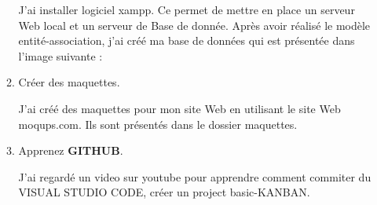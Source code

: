 \documentclass{article}
\begin{document}
\begin{enumerate}
\begin{enumerate}
           
            \setlength{\parindent}{1cm}  J'ai installer logiciel xampp. Ce permet de mettre en place un serveur Web local et un serveur de Base de donnée. Après avoir réalisé le modèle entité-association, j'ai créé ma base de données qui est présentée dans l'image suivante :
            
            
            
            \hspace*{-1.05in}
               \noindent{}
        
        
         \item \textcolor{amethyst}{Créer des maquettes}.
         
         \vspace{0.4cm}
                \setlength{\parindent}{1cm} J'ai créé des maquettes pour mon site Web en utilisant le site Web moqups.com. Ils sont présentés dans le dossier maquettes.
         
         \item \textcolor{amethyst}{Apprenez \textbf{GITHUB}}.
         
         \vspace{0.4cm}
                \setlength{\parindent}{1cm} J'ai regardé un video sur youtube pour apprendre comment commiter du VISUAL STUDIO CODE, créer un project basic-KANBAN.
         

\end{enumerate}
\end{enumerate}
\end{document}
